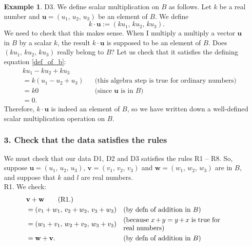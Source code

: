 \documentclass[a4paper,11pt]{book}
\theoremstyle{definition}
\newtheorem{example_environment}{Example}[chapter]
\newcommand{\be}{\begin{equation}}
\newcommand{\ee}{\end{equation}}
\newcommand{\ve}[1]{\mathbf{#1}}
\newenvironment{example}
	{
		\begin{oframed} 
		\begin{example_environment}
	}
	{
		\end{example_environment}
		\end{oframed}
	}
\begin{document}
\begin{example}
\noindent D3. We define scalar multiplication on $B$ as follows. Let $k$ be a real number and $\ve{u} = (u_1, \, u_2, \, u_3)$ be an element of $B$. We define
\be \label{s_mu_in_B}
  k \cdot \ve{u} := (ku_1, \, ku_2, \, ku_3).
\ee
We need to check that this makes sense. When I multiply a multiply a vector $\ve{u}$ in $B$ by a scalar $k$, the result $k \cdot \ve{u}$ is supposed to be an element of $B$. Does $(ku_1, \, ku_2, \, ku_3)$ really belong to $B$? Let us check that it satisfies the defining equation \eqref{def_of_b}:
\begin{align*}
	& ku_1 - ku_2 + ku_3  \\
	&= k (u_1 - u_2 + u_3) && \mbox{(this algebra step is true for ordinary numbers)} \\
	&= k 0 && \mbox{(since $\ve{u}$ is in $B$)} \\
	&= 0.
\end{align*}
Therefore, $k \cdot \ve{u}$ is indeed an element of $B$, so we have written down a well-defined scalar multiplication operation on $B$. 

\subsubsection{3. Check that the data satisfies the rules}
We must check that our data D1, D2 and D3 satisfies the rules R1 -- R8. So, suppose $\ve{u} = (u_1, \, u_2, \,u_3)$, $\ve{v} = (v_1, \, v_2, \, v_3)$ and $\ve{w} = (w_1, \, w_2, \, w_3)$ are in $B$, and suppose that $k$ and $l$ are real numbers. \\

\noindent R1. We check: 
\begin{align*}
& \ve{v} + \ve{w}\tag{R1.} \\ 
& = (v_1 + w_1, \, v_2 + w_2, \, v_3 + w_3) && \mbox{(by defn of addition in $B$)} \\
& = (w_1 + v_1, \, w_2 + v_2, \, w_3 + v_3) && \mbox{\begin{minipage}{5cm}(because $x + y = y + x$ is true for real numbers)\end{minipage}} \\
&= \ve{w} + \ve{v}. && \mbox{(by defn of addition in $B$)}
\end{align*}


\end{example}
\end{document}
